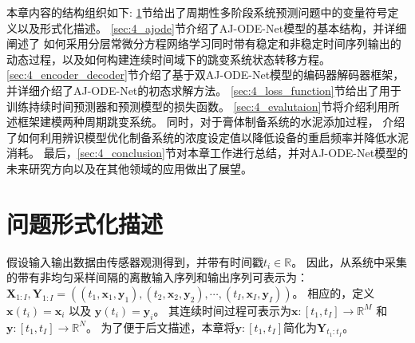 本章内容的结构组织如下:
\ref{sec:4_notations}节给出了周期性多阶段系统预测问题中的变量符号定义以及形式化描述。
\ref{sec:4_ajode}节介绍了AJ-ODE-Net模型的基本结构，并详细阐述了
如何采用分层常微分方程网络学习同时带有稳定和非稳定时间序列输出的动态过程，以及如何构建连续时间域下的跳变系统状态转移方程。
\ref{sec:4_encoder_decoder}节介绍了基于双AJ-ODE-Net模型的编码器解码器框架，并详细介绍了AJ-ODE-Net的初态求解方法。
\ref{sec:4_loss_function}节给出了用于训练持续时间预测器和预测模型的损失函数。
\ref{sec:4_evalutaion}节将介绍利用所述框架建模两种周期跳变系统。
同时，对于膏体制备系统的水泥添加过程，
介绍了如何利用辨识模型优化制备系统的浓度设定值以降低设备的重启频率并降低水泥消耗。
最后，\ref{sec:4_conclusion}节对本章工作进行总结，并对AJ-ODE-Net模型的未来研究方向以及在其他领域的应用做出了展望。


\section{问题形式化描述}
\label{sec:4_notations}
假设输入输出数据由传感器观测得到，并带有时间戳$t_i\in \mathbb{R}$。
因此，从系统中采集的带有非均匀采样间隔的离散输入序列和输出序列可表示为：
$\boldsymbol X_{1:I},\boldsymbol Y_{1:I}= ((t_1,\boldsymbol x_1,\boldsymbol y_1),(t_2,\boldsymbol x_2, \boldsymbol y_2),\cdots,(t_I,\boldsymbol x_I,\boldsymbol y_I))$。
相应的，定义$\boldsymbol x(t_i)=\boldsymbol x_i$ 以及 $\boldsymbol y(t_i)=\boldsymbol y_i$。
其连续时间过程可表示为$\boldsymbol x:\left[t_{1}, t_{I}\right] \rightarrow \mathbb{R}^{M}$ 和 $\boldsymbol y:\left[t_{1}, t_{I}\right] \rightarrow \mathbb{R}^{N}$。
为了便于后文描述，本章将$\boldsymbol y:\left[t_{1}, t_{I}\right]$简化为$\boldsymbol Y_{t_1:t_I}$。


